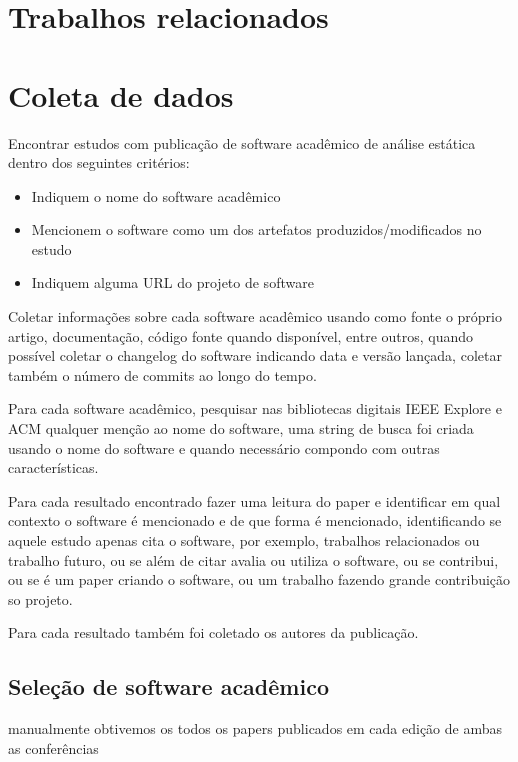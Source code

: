 \section{Trabalhos relacionados}

\cite{howison2016software} \cite{howison2015understanding} \cite{howison2011scientific}

\section{Coleta de dados}

Encontrar estudos com publicação de software acadêmico de análise estática
dentro dos seguintes critérios:

\begin{itemize}
  \item Indiquem o nome do software acadêmico
  \item Mencionem o software como um dos artefatos produzidos/modificados no estudo
  \item Indiquem alguma URL do projeto de software
\end{itemize}

Coletar informações sobre cada software acadêmico usando como fonte o próprio
artigo, documentação, código fonte quando disponível, entre outros, quando possível
coletar o changelog do software indicando data e versão lançada, coletar também
o número de commits ao longo do tempo.

Para cada software acadêmico, pesquisar nas bibliotecas digitais IEEE Explore e
ACM qualquer menção ao nome do software, uma string de busca foi criada usando
o nome do software e quando necessário compondo com outras características.

Para cada resultado encontrado fazer uma leitura do paper e identificar em
qual contexto o software é mencionado e de que forma é mencionado, identificando
se aquele estudo apenas cita o software, por exemplo, trabalhos relacionados
ou trabalho futuro, ou se além de citar avalia ou utiliza o software, ou se
contribui, ou se é um paper criando o software, ou um trabalho fazendo grande
contribuição so projeto.

Para cada resultado também foi coletado os autores da publicação.

\subsection{Seleção de software acadêmico}

manualmente obtivemos os todos os papers publicados em cada edição
de ambas as conferências

